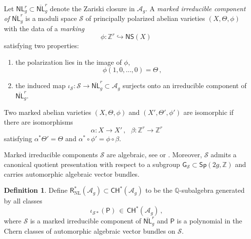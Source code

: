 \documentclass[11pt]{amsart}
\theoremstyle{definition}
\newtheorem{definition}[thm]{Definition}
\newcommand{\qq}{\mathbb{Q}}
\newcommand{\A}{\mathcal{A}}
\newcommand{\CH}{\mathsf{CH}}
\begin{document}
Let $\mathsf{NL}^r_g\subset 
\overline{\mathsf{NL}}^r_g$ denote
the Zariski closure in $\A_g$.
A {\em marked irreducible component of
$\overline{\mathsf{NL}}^r_g$}
is a moduli space $\mathcal{S}$ of principally polarized abelian varieties 
$(X,\Theta,\phi)$
with the data of a {\em marking}
$$\phi: \mathbb{Z}^r \hookrightarrow \mathsf{NS}(X)\, $$
satisfying two properties:
\begin{enumerate}
    \item [(i)] the polarization lies in the image of $\phi$, $$\phi(1,0,\ldots,0)= \Theta\,,$$
    \item[(ii)] the induced map
    $\iota_{\mathcal{S}}: \mathcal{S} \rightarrow \overline{\mathsf{NL}}^r_g\subset \A_g$
    surjects
    onto an irreducible component of $\overline{\mathsf{NL}}^r_g$.
\end{enumerate}
Two marked abelian varieties $(X,\Theta, \phi)$ and $(X',\Theta',\phi')$
are isomorphic
if there are isomorphisms
$$\alpha:X \rightarrow X'\, , \ \ \ \beta:\mathbb{Z}^r\rightarrow \mathbb{Z}^r$$
satisfying $\alpha^*\Theta' =\Theta$ and
$\alpha^*\circ \phi'= \phi \circ \beta $.

Marked irreducible components $\mathcal{S}$
 are algebraic, see \cite{CDK} or \cite[Remarque 1]{DL}. Moreover,
 $\mathcal{S}$ admits a canonical quotient
 presentation with respect to a subgroup
 $\mathsf{G}_{\mathcal{S}}\subset \mathsf{Sp}(2g, \mathbb{Z})$ and carries
 automorphic algebraic vector bundles.



\begin{definition}
    Define 
$\mathsf{R}^*_{\mathrm{NL}}(\mathcal{A}_g) \subset \CH^*(\mathcal{A}_g)$
to be the $\qq$-subalgebra generated by
all classes
$$\iota_{\mathcal{S}*}(\mathsf{P})\, 
\in\,  \CH^*(\mathcal{A}_g)\, ,
$$
where $\mathcal{S}$ is a marked 
irreducible component of
$\overline{\mathsf{NL}}^r_g$ 
 and $\mathsf{P}$
is a polynomial in the Chern classes
of automorphic algebraic vector bundles
on $\mathcal{S}.$
\end{definition}
\end{document}
